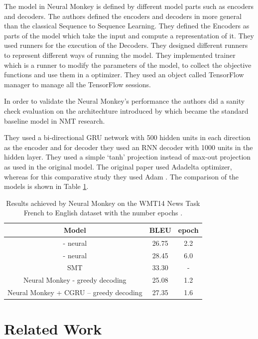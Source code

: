 The model in Neural Monkey is defined by different model parts such as encoders and decoders. The authors defined the encoders and decoders in more general than the classical Sequence to Sequence Learning. They defined the Encoders as parts of the model which take the input and compute a representation of it. They used runners for the execution of the Decoders. They designed different runners to represent different ways of running the model. They implemented trainer which is a runner to modify the parameters of the model, to collect the objective functions and use them in a optimizer. They used an object called TensorFlow manager to manage all the TensorFlow sessions. 

In order to validate the Neural Monkey’s performance the authors did a sanity check evaluation on the architechture introduced by \cite{DBLP:journals/corr/BahdanauCB14} which became the standard baseline model in NMT research. 


They used a bi-directional GRU network with 500 hidden units in each direction as the encoder and for decoder they used an RNN decoder with 1000 units in the hidden layer. They used a simple ‘tanh’ projection instead of max-out projection as used in the original model. The original paper used Adadelta \citep {DBLP:journals/corr/abs-1212-5701} optimizer, whereas for this comparative study they used Adam \citep{DBLP:journals/corr/KingmaB14} . The comparison of the models is shown in Table \ref{neumonk}. 

\begin{table}[h!]
\centering
 \begin{tabular}{ |c|c|c| } 
  \hline Model & BLEU & epoch \\ 
  \hline  \cite{DBLP:journals/corr/BahdanauCB14} - neural & 26.75 & 2.2\\
 \cite{DBLP:journals/corr/BahdanauCB14} - neural & 28.45 & 6.0\\
  SMT & 33.30 & -\\
  \hline Neural Monkey - greedy decoding & 25.08 & 1.2\\
  Neural Monkey + CGRU – greedy decoding  & 27.35 & 1.6\\
  \hline
 \end{tabular}
\caption{Results achieved by Neural Monkey on the WMT14 News Task French to English dataset with the number epochs \citep{neuralmonk}.}
\label{neumonk}
\end{table}

\section{Related Work}

